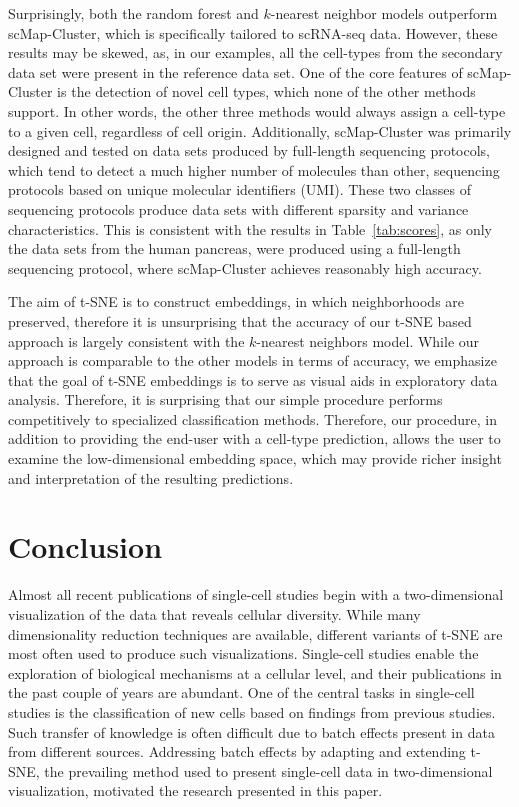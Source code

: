 \documentclass[runningheads]{llncs}
\begin{document}
Surprisingly, both the random forest and $k$-nearest neighbor models outperform
scMap-Cluster, which is specifically tailored to scRNA-seq data. However, these
results may be skewed, as, in our examples, all the cell-types from the
secondary data set were present in the reference data set. One of the core
features of scMap-Cluster is the detection of novel cell types, which none of
the other methods support. In other words, the other three methods would always
assign a cell-type to a given cell, regardless of cell origin. Additionally,
scMap-Cluster was primarily designed and tested on data sets produced by
full-length sequencing protocols, which tend to detect a much higher number of
molecules than other, sequencing protocols based on unique molecular identifiers
(UMI). These two classes of sequencing protocols produce data sets with
different sparsity and variance characteristics. This is consistent with the
results in Table~\ref{tab:scores}, as only the data sets from the human
pancreas, were produced using a full-length sequencing protocol, where
scMap-Cluster achieves reasonably high accuracy.

The aim of t-SNE is to construct embeddings, in which neighborhoods are
preserved, therefore it is unsurprising that the accuracy of our t-SNE based
approach is largely consistent with the $k$-nearest neighbors model. While our
approach is comparable to the other models in terms of accuracy, we emphasize
that the goal of t-SNE embeddings is to serve as visual aids in exploratory data
analysis. Therefore, it is surprising that our simple procedure performs
competitively to specialized classification methods. Therefore, our procedure,
in addition to providing the end-user with a cell-type prediction, allows the
user to examine the low-dimensional embedding space, which may provide richer
insight and interpretation of the resulting predictions.

\section{Conclusion}

Almost all recent publications of single-cell studies begin with a
two-dimensional visualization of the data that reveals cellular diversity. While
many dimensionality reduction techniques are available, different  variants of
t-SNE are most often used to produce such visualizations. Single-cell studies
enable the exploration of biological mechanisms at a cellular level, and their
publications in the past couple of years are abundant. One of the central tasks
in single-cell studies is the classification of new cells based on findings from
previous studies. Such transfer of knowledge is often difficult due to batch
effects present in data from different sources. Addressing batch effects by
adapting and extending t-SNE, the prevailing method used to present single-cell
data in two-dimensional visualization, motivated the research presented in this
paper.
\end{document}
